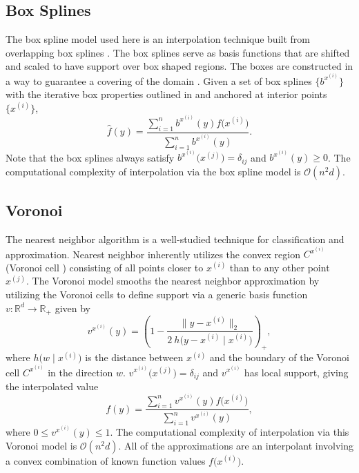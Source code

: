 \documentclass[smallextended,final]{svjour3}  %
\begin{document}
\subsection{Box Splines}
\label{sec:box-splines}

The box spline model used here is an interpolation technique built
from overlapping box splines \cite{de2013box}. The box splines serve
as basis functions that are shifted and scaled to have support over
box shaped regions. The boxes are constructed in a way to guarantee a
covering of the domain \cite{lux2018novel}. Given a set of box splines
$\bigl\{b^{x^{(i)}}\bigr\}$ with the iterative box properties outlined
in \cite{lux2018novel} and anchored at interior points
$\bigl\{x^{(i)}\bigr\}$,
 $$ \hat f(y) = \frac{\sum\limits_{i=1}^n b^{x^{(i)}}(y) f\bigl(x^{(i)}\bigr)}{\sum\limits_{i=1}^n b^{x^{(i)}}(y)}. $$
Note that the box splines always satisfy
$b^{x^{(i)}}\bigl(x^{(j)}\bigr) = \delta_{ij}$ and $b^{x^{(i)}}(y)
\geq 0$. The computational complexity of interpolation via the box
spline model is $\mathcal{O}(n^2 d)$.

\subsection{Voronoi}
\label{sec:voronoi}

The nearest neighbor algorithm \cite{cover1967nearest} is a
well-studied technique for classification and approximation. Nearest
neighbor inherently utilizes the convex region $C^{x^{(i)}}$ (Voronoi
cell \cite{dirichlet1850reduction}) consisting of all points closer to
$x^{(i)}$ than to any other point $x^{(j)}$. The Voronoi model smooths
the nearest neighbor approximation by utilizing the Voronoi cells to
define support via a generic basis function $v: \mathbb{R}^d
\rightarrow \mathbb{R}_+$ given by
 $$ v^{x^{(i)}}(y) = \left(1 - \frac{\bigl\|y - x^{(i)}\bigr\|_2}
 {2 \ h \bigl(y - x^{(i)} \mid x^{(i)}\bigr)} \right)_+, $$
where $h\bigl(w \mid x^{(i)}\bigr)$ is the distance between $x^{(i)}$
and the boundary of the Voronoi cell $C^{x^{(i)}}$ in the direction
$w$. $v^{x^{(i)}}\bigl(x^{(j)}\bigr) = \delta_{ij}$ and $v^{x^{(i)}}$
has local support, giving the interpolated value
 $$ f(y) = \frac{\sum\limits_{i=1}^n v^{x^{(i)}}(y)
  f\bigl(x^{(i)}\bigr)}{\sum\limits_{i=1}^n v^{x^{(i)}}(y)}, $$
where $0 \leq v^{x^{(i)}}(y) \leq 1$. The computational complexity of
interpolation via this Voronoi model is $\mathcal{O}(n^2 d)$. All of
the approximations are an interpolant involving a convex combination
of known function values $f\bigl(x^{(i)}\bigr)$.
\end{document}
